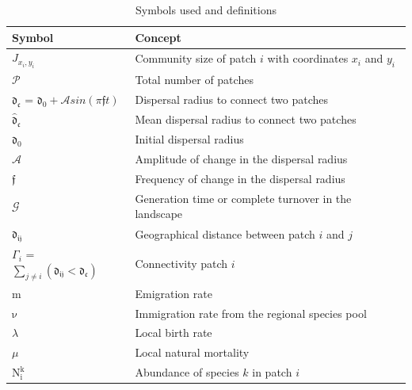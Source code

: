 \documentclass[a4paper,12pt]{article}
\begin{document}
\newpage
\begin{table}[!ht]
\caption{Symbols used and definitions}
\begin{tabular}{  p{5cm}  |  p{12cm} }
 \hline
  \textbf{Symbol} & \textbf{Concept}\\  \hline
  $J_{x_i,y_i}$ & Community size of patch $i$ with coordinates $x_i$ and $y_i$ \\ \hline
  $\mathcal{P}$ & Total number of patches \\ \hline
  $\mathfrak{d_{c}}$ = $\mathfrak{d_{0}} + \mathcal{A} sin (\pi \mathfrak{f} t)$ & Dispersal radius to connect two patches \\ \hline
  $\mathfrak{\hat{d}_{c}}$ & Mean dispersal radius to connect two patches \\ \hline
  $\mathfrak{d_{0}}$ & Initial dispersal radius \\ \hline
  $\mathcal{A}$ & Amplitude of change in the dispersal radius \\ \hline
  $\mathfrak{f}$ & Frequency of change in the dispersal radius \\ \hline
  $\mathcal{G}$ & Generation time or complete turnover in the landscape \\ \hline
  $\mathfrak{d_{ij}}$ & Geographical distance between patch $i$ and $j$ \\ \hline
  $\Gamma_{i}$ = $\sum_{j \neq i} (\mathfrak{d_{ij}} < \mathfrak{d_{c}})$ & Connectivity patch $i$ \\ \hline
  $\mathrm{m}$ & Emigration rate \\ \hline
  $\mathrm{\nu}$ & Immigration rate from the regional species pool \\ \hline
  $\lambda$ & Local birth rate \\ \hline  $\mu$ & Local natural mortality \\ \hline
  $\mathrm{N^{k}_{i}}$ & Abundance of species $k$ in patch $i$ \\ \hline  

\end{tabular}
\end{table}
\end{document}
